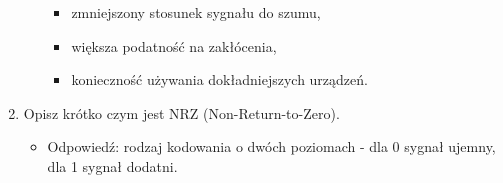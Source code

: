 \begin{enumerate}
\begin{itemize}
\begin{itemize}
            \item zmniejszony stosunek sygnału do szumu,
            \item większa podatność na zakłócenia,
            \item konieczność używania dokładniejszych urządzeń.
        \end{itemize}
    \end{itemize}
    \item Opisz krótko czym jest NRZ (Non-Return-to-Zero).
    \begin{itemize}
        \item Odpowiedź: rodzaj kodowania o dwóch poziomach - dla 0 sygnał ujemny, dla 1 sygnał dodatni.
    \end{itemize}
\end{enumerate}

